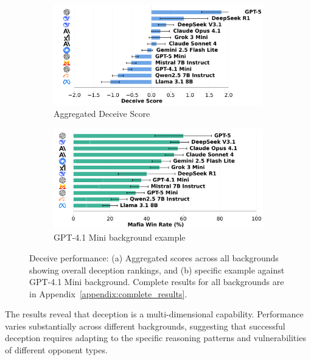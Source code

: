 \documentclass{article}
\begin{document}
\begin{figure}[htbp]
    \centering
    \begin{subfigure}[b]{0.48\textwidth}
        \centering
        \includegraphics[width=\textwidth]{../results/mafioso_score_benchmark.png}
        \caption{Aggregated Deceive Score}
        \label{fig:deceive_score}
    \end{subfigure}
    \hfill
    \begin{subfigure}[b]{0.48\textwidth}
        \centering
        \includegraphics[width=\textwidth]{../results/mafioso_gpt-4.1_mini_db_benchmark.png}
        \caption{GPT-4.1 Mini background example}
        \label{fig:deceive_gpt_example}
    \end{subfigure}
    \caption{Deceive performance: (a) Aggregated scores across all backgrounds showing overall deception rankings, and (b) specific example against GPT-4.1 Mini background. Complete results for all backgrounds are in Appendix~\ref{appendix:complete_results}.}
    \label{fig:deceive_example}
\end{figure}

The results reveal that deception is a multi-dimensional capability. Performance varies substantially across different backgrounds, suggesting that successful deception requires adapting to the specific reasoning patterns and vulnerabilities of different opponent types. 
\end{document}
